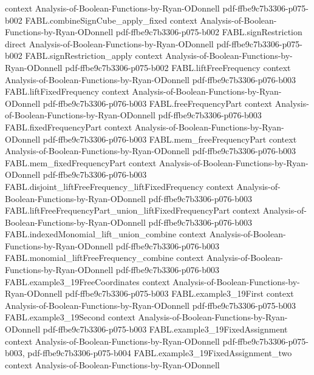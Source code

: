 \begin{theorem}
  {context}
  {Analysis-of-Boolean-Functions-by-Ryan-ODonnell}
  {pdf-ffbe9c7b3306-p075-b002}
\proofstep
  {FABL.combineSignCube_apply_fixed}
  {context}
  {Analysis-of-Boolean-Functions-by-Ryan-ODonnell}
  {pdf-ffbe9c7b3306-p075-b002}
\proofstep
  {FABL.signRestriction}
  {direct}
  {Analysis-of-Boolean-Functions-by-Ryan-ODonnell}
  {pdf-ffbe9c7b3306-p075-b002}
\proofstep
  {FABL.signRestriction_apply}
  {context}
  {Analysis-of-Boolean-Functions-by-Ryan-ODonnell}
  {pdf-ffbe9c7b3306-p075-b002}
\proofstep
  {FABL.liftFreeFrequency}
  {context}
  {Analysis-of-Boolean-Functions-by-Ryan-ODonnell}
  {pdf-ffbe9c7b3306-p076-b003}
\proofstep
  {FABL.liftFixedFrequency}
  {context}
  {Analysis-of-Boolean-Functions-by-Ryan-ODonnell}
  {pdf-ffbe9c7b3306-p076-b003}
\proofstep
  {FABL.freeFrequencyPart}
  {context}
  {Analysis-of-Boolean-Functions-by-Ryan-ODonnell}
  {pdf-ffbe9c7b3306-p076-b003}
\proofstep
  {FABL.fixedFrequencyPart}
  {context}
  {Analysis-of-Boolean-Functions-by-Ryan-ODonnell}
  {pdf-ffbe9c7b3306-p076-b003}
\proofstep
  {FABL.mem_freeFrequencyPart}
  {context}
  {Analysis-of-Boolean-Functions-by-Ryan-ODonnell}
  {pdf-ffbe9c7b3306-p076-b003}
\proofstep
  {FABL.mem_fixedFrequencyPart}
  {context}
  {Analysis-of-Boolean-Functions-by-Ryan-ODonnell}
  {pdf-ffbe9c7b3306-p076-b003}
\proofstep
  {FABL.disjoint_liftFreeFrequency_liftFixedFrequency}
  {context}
  {Analysis-of-Boolean-Functions-by-Ryan-ODonnell}
  {pdf-ffbe9c7b3306-p076-b003}
\proofstep
  {FABL.liftFreeFrequencyPart_union_liftFixedFrequencyPart}
  {context}
  {Analysis-of-Boolean-Functions-by-Ryan-ODonnell}
  {pdf-ffbe9c7b3306-p076-b003}
\proofstep
  {FABL.indexedMonomial_lift_union_combine}
  {context}
  {Analysis-of-Boolean-Functions-by-Ryan-ODonnell}
  {pdf-ffbe9c7b3306-p076-b003}
\proofstep
  {FABL.monomial_liftFreeFrequency_combine}
  {context}
  {Analysis-of-Boolean-Functions-by-Ryan-ODonnell}
  {pdf-ffbe9c7b3306-p076-b003}
\proofstep
  {FABL.example3_19FreeCoordinates}
  {context}
  {Analysis-of-Boolean-Functions-by-Ryan-ODonnell}
  {pdf-ffbe9c7b3306-p075-b003}
\proofstep
  {FABL.example3_19First}
  {context}
  {Analysis-of-Boolean-Functions-by-Ryan-ODonnell}
  {pdf-ffbe9c7b3306-p075-b003}
\proofstep
  {FABL.example3_19Second}
  {context}
  {Analysis-of-Boolean-Functions-by-Ryan-ODonnell}
  {pdf-ffbe9c7b3306-p075-b003}
\proofstep
  {FABL.example3_19FixedAssignment}
  {context}
  {Analysis-of-Boolean-Functions-by-Ryan-ODonnell}
  {pdf-ffbe9c7b3306-p075-b003,
    pdf-ffbe9c7b3306-p075-b004}
\proofstep
  {FABL.example3_19FixedAssignment_two}
  {context}
  {Analysis-of-Boolean-Functions-by-Ryan-ODonnell}

\end{theorem}
